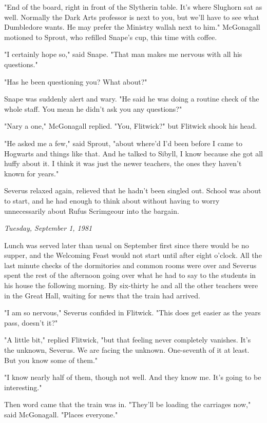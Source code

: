\documentclass[a4paper,11pt]{article}
\begin{document}
"End of the board, right in front of the Slytherin table. It's where Slughorn sat as well. Normally the Dark Arts professor is next to you, but we'll have to see what Dumbledore wants. He may prefer the Ministry wallah next to him." McGonagall motioned to Sprout, who refilled Snape's cup, this time with coffee.

"I certainly hope so," said Snape. "That man makes me nervous with all his questions."

"Has he been questioning you? What about?"

Snape was suddenly alert and wary. "He said he was doing a routine check of the whole staff. You mean he didn't ask you any questions?"

"Nary a one," McGonagall replied. "You, Flitwick?" but Flitwick shook his head.

"He asked me a few," said Sprout, "about where'd I'd been before I came to Hogwarts and things like that. And he talked to Sibyll, I know because she got all huffy about it. I think it was just the newer teachers, the ones they haven't known for years."

Severus relaxed again, relieved that he hadn't been singled out. School was about to start, and he had enough to think about without having to worry unnecessarily about Rufus Scrimgeour into the bargain.

\emph{Tuesday, September 1, 1981}

Lunch was served later than usual on September first since there would be no supper, and the Welcoming Feast would not start until after eight o'clock. All the last minute checks of the dormitories and common rooms were over and Severus spent the rest of the afternoon going over what he had to say to the students in his house the following morning. By six-thirty he and all the other teachers were in the Great Hall, waiting for news that the train had arrived.

"I am so nervous," Severus confided in Flitwick. "This does get easier as the years pass, doesn't it?"

"A little bit," replied Flitwick, "but that feeling never completely vanishes. It's the unknown, Severus. We are facing the unknown. One-seventh of it at least. But you know some of them."

"I know nearly half of them, though not well. And they know me. It's going to be interesting."

Then word came that the train was in. "They'll be loading the carriages now," said McGonagall. "Places everyone."
\end{document}
